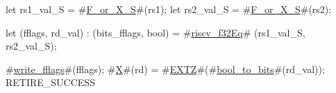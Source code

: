 let rs1_val_S = #\hyperref[sailRISCVzFzyorzyXzyS]{F\_or\_X\_S}#(rs1);
let rs2_val_S = #\hyperref[sailRISCVzFzyorzyXzyS]{F\_or\_X\_S}#(rs2);

let (fflags, rd_val) : (bits_fflags, bool) =
    #\hyperref[sailRISCVzriscvzyf32Eq]{riscv\_f32Eq}# (rs1_val_S, rs2_val_S);

#\hyperref[sailRISCVzwritezyfflags]{write\_fflags}#(fflags);
#\hyperref[sailRISCVzX]{X}#(rd) = #\hyperref[sailRISCVzEXTZ]{EXTZ}#(#\hyperref[sailRISCVzboolzytozybits]{bool\_to\_bits}#(rd_val));
RETIRE_SUCCESS

